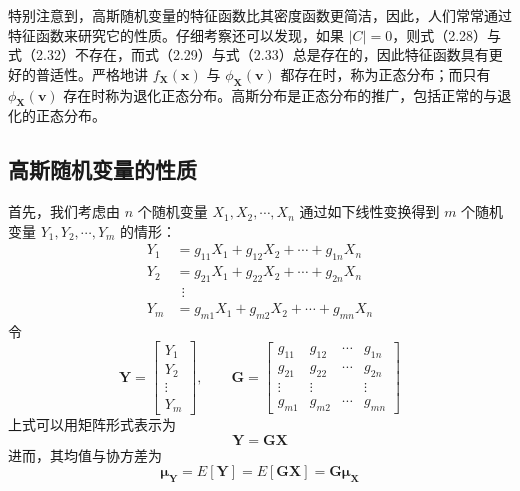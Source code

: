 \documentclass[11pt,openany,UTF8]{ctexbook}
\newcommand{\bX}{\bm{X}}
\newcommand{\bx}{\bm{x}}
\begin{document}
特别注意到\nobreak，高斯随机变量的特征函数比其密度函数更简洁\nobreak，因此\nobreak，人们常常通过特征函数来研究它的性质\nobreak。仔细考察还可以发现\nobreak，如果 $\lvert C\rvert=0$\nobreak，则式\nobreak（2.28\nobreak）与式\nobreak（2.32\nobreak）不存在\nobreak，而式\nobreak（2.29\nobreak）与式\nobreak（2.33\nobreak）总是存在的\nobreak，因此特征函数具有更好的普适性\nobreak。严格地讲 $f_{\bX}(\bx)$ 与 $\phi_{\bX}(\bm{v})$ 都存在时\nobreak，称为正态分布\nobreak；而只有 $\phi_{\bX}(\bm{v})$ 存在时称为退化正态分布\nobreak。高斯分布是正态分布的推广\nobreak，包括正常的与退化的正态分布\nobreak。

\subsection{高斯随机变量的性质}
首先\nobreak，我们考虑由 $n$ 个随机变量 $X_1,X_2,\cdots,X_n$ 通过如下线性变换得到 $m$ 个随机变量 $Y_1,Y_2,\cdots,Y_m$ 的情形\nobreak：
\begin{equation}
\begin{aligned}
Y_1&=g_{11}X_1+g_{12}X_2+\cdots+g_{1n}X_n\\
Y_2&=g_{21}X_1+g_{22}X_2+\cdots+g_{2n}X_n\\
   &\ \ \vdots\\
Y_m&=g_{m1}X_1+g_{m2}X_2+\cdots+g_{mn}X_n
\end{aligned}
\label{eq:2.34}
\end{equation}
令
\[
\bm{Y}=\begin{bmatrix}Y_1\\Y_2\\\vdots\\Y_m\end{bmatrix},\qquad
\bm{G}=\begin{bmatrix}
g_{11} & g_{12} & \cdots & g_{1n}\\
g_{21} & g_{22} & \cdots & g_{2n}\\
\vdots & \vdots &        & \vdots\\
g_{m1} & g_{m2} & \cdots & g_{mn}
\end{bmatrix}
\]
上式可以用矩阵形式表示为
\begin{equation}
\bm{Y}=\bm{G}\bX
\label{eq:2.35}
\end{equation}
进而\nobreak，其均值与协方差为
\begin{equation}
\bm{\mu}_{\bm{Y}}=E[\bm{Y}]=E[\bm{G}\bX]=\bm{G}\bm{\mu}_{\bX}
\label{eq:2.36}
\end{equation}
\end{document}
